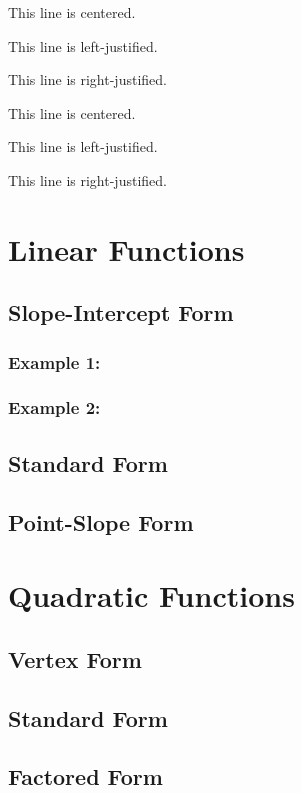 \documentclass[11pt]{article}
\begin{document}
This line is centered.

This line is left-justified.

This line is right-justified.
\tiny

This line is centered.

This line is left-justified.

This line is right-justified.
\section{Linear Functions}
    \subsection{Slope-Intercept Form}
        \subsubsection{Example 1:}
        \subsubsection{Example 2:}
    \subsection{Standard Form}
    \subsection{Point-Slope Form}
\section*{Quadratic Functions}
    \subsection{Vertex Form}
    \subsection{Standard Form}
    \subsection{Factored Form}
\end{document}
